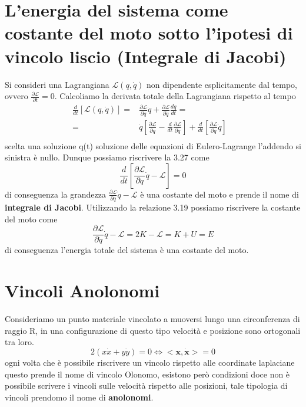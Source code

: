 \section{L'energia del sistema come costante del moto sotto l'ipotesi di vincolo liscio (Integrale di Jacobi) }
Si consideri una Lagrangiana $\mathcal{L}(q,\dot{q})$ non dipendente esplicitamente dal tempo, ovvero $\frac{\partial \mathcal{L}}{\partial t} = 0$. Calcoliamo la derivata totale della Lagrangiana rispetto al tempo
\begin{equation}
\begin{aligned}
\frac{d}{d t}[\mathcal{L}(q, \dot{q})]= & \frac{\partial \mathcal{L}}{\partial q} \dot{q}+\frac{\partial \mathcal{L}}{\partial \dot{q}} \frac{d \dot{q}}{d t} = & \\[0.1in]
= & \dot{q} \left[\frac{\partial \mathcal{L}}{\partial q}-\frac{d}{d t} \frac{\partial \mathcal{L}}{\partial \dot{q}}\right]+\frac{d}{d t}\left[\frac{\partial \mathcal{L}}{\partial \dot{q}} \dot{q}\right] \\
\end{aligned}
\end{equation}
scelta una soluzione q(t) soluzione delle equazioni di Eulero-Lagrange l'addendo si sinistra \`{e} nullo. Dunque possiamo riscrivere la 3.27 come
\begin{equation}
\frac{d}{d t}\left[\frac{\partial \mathcal{L}}{\partial q} \dot{q}-\mathcal{L}\right] = 0
\end{equation}
di conseguenza la grandezza $\frac{\partial \mathcal{L}}{\partial q} \dot{q}-\mathcal{L}$ \`{e} una costante del moto e prende il nome di \textbf{integrale di Jacobi}. Utilizzando la relazione 3.19 possiamo riscrivere la costante del moto come
\begin{equation}
\frac{\partial \mathcal{L}}{\partial \dot{q}} \dot{q}-\mathcal{L}=2 K-\mathcal{L}=K+U = E
\end{equation}
di conseguenza l'energia totale del sistema \`{e} una costante del moto.
\section{Vincoli Anolonomi}
Consideriamo un punto materiale vincolato a muoversi lungo una circonferenza di raggio R, in una configurazione di questo tipo velocit\`{a} e posizione sono ortogonali tra loro.
\begin{equation}
	2(x\dot{x} + y \dot{y}) = 0 \iff <\bm{x},\bm{\dot{x}}> =0
\end{equation}
ogni volta che \`{e} possibile riscrivere un vincolo rispetto alle coordinate laplaciane questo prende il nome di vincolo Olonomo, esistono per\`{o} condizioni doce non \`{e} possibile scrivere i vincoli sulle velocit\`{a} rispetto alle posizioni, tale tipologia di vincoli prendomo il nome di \textbf{anolonomi}.
